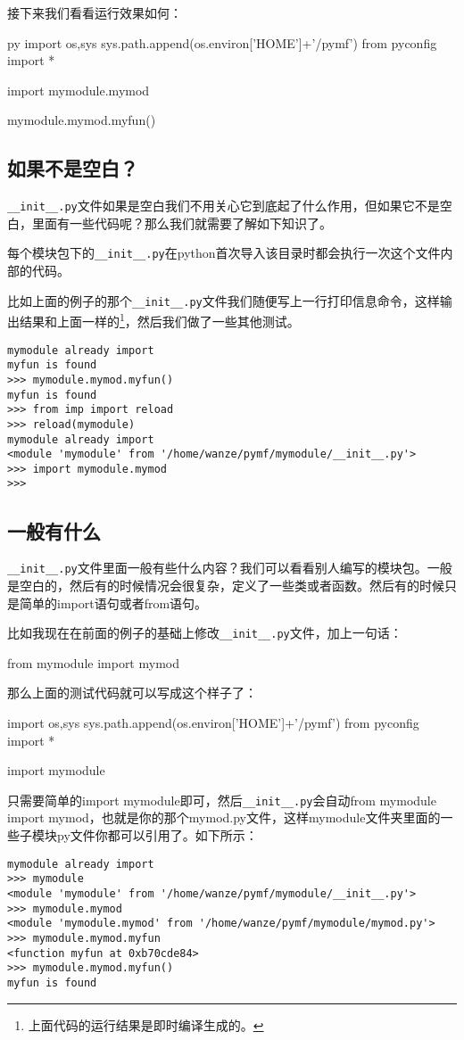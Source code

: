 \documentclass[12pt,oneside]{book}
\begin{document}
\begin{common-format}
接下来我们看看运行效果如何：
\begin{xverbatim}[129]{py}
import os,sys
sys.path.append(os.environ['HOME']+'/pymf')
from pyconfig import *

import mymodule.mymod

mymodule.mymod.myfun()
\end{xverbatim}



\subsection{如果不是空白？}
\verb+__init__.py+文件如果是空白我们不用关心它到底起了什么作用，但如果它不是空白，里面有一些代码呢？那么我们就需要了解如下知识了。

每个模块包下的\verb+__init__.py+在python首次导入该目录时都会执行一次这个文件内部的代码。

比如上面的例子的那个\verb+__init__.py+文件我们随便写上一行打印信息命令，这样输出结果和上面一样的\footnote{上面代码的运行结果是即时编译生成的。}，然后我们做了一些其他测试。
\begin{Verbatim}
mymodule already import
myfun is found
>>> mymodule.mymod.myfun()
myfun is found
>>> from imp import reload
>>> reload(mymodule)
mymodule already import
<module 'mymodule' from '/home/wanze/pymf/mymodule/__init__.py'>
>>> import mymodule.mymod
>>> 
\end{Verbatim}

\subsection{一般有什么}
\verb+__init__.py+文件里面一般有些什么内容？我们可以看看别人编写的模块包。一般是空白的，然后有的时候情况会很复杂，定义了一些类或者函数。然后有的时候只是简单的import语句或者from语句。

比如我现在在前面的例子的基础上修改\verb+__init__.py+文件，加上一句话：
\begin{tcbpython}
from mymodule import  mymod
\end{tcbpython}

那么上面的测试代码就可以写成这个样子了：
\begin{tcbpython}
import os,sys
sys.path.append(os.environ['HOME']+'/pymf')
from pyconfig import *

import mymodule
\end{tcbpython}

只需要简单的import mymodule即可，然后\verb+__init__.py+会自动from mymodule import mymod，也就是你的那个mymod.py文件，这样mymodule文件夹里面的一些子模块py文件你都可以引用了。如下所示：
\begin{Verbatim}
mymodule already import
>>> mymodule
<module 'mymodule' from '/home/wanze/pymf/mymodule/__init__.py'>
>>> mymodule.mymod
<module 'mymodule.mymod' from '/home/wanze/pymf/mymodule/mymod.py'>
>>> mymodule.mymod.myfun
<function myfun at 0xb70cde84>
>>> mymodule.mymod.myfun()
myfun is found
\end{Verbatim}


\end{common-format}
\end{document}
